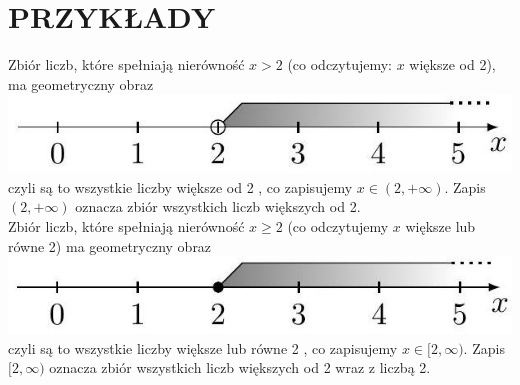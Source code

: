\documentclass[10pt]{article}
\begin{document}
\section*{PRZYKŁADY}
Zbiór liczb, które spełniają nierówność \(x>2\) (co odczytujemy: \(x\) większe od 2), ma geometryczny obraz\\
\includegraphics[max width=\textwidth, center]{2024_11_21_8f01584889ff06348ae7g-162}\\
czyli są to wszystkie liczby większe od 2 , co zapisujemy \(x \in(2,+\infty)\). Zapis \((2,+\infty)\) oznacza zbiór wszystkich liczb większych od 2.\\
Zbiór liczb, które spełniają nierówność \(x \geqslant 2\) (co odczytujemy \(x\) większe lub równe 2) ma geometryczny obraz\\
\includegraphics[max width=\textwidth, center]{2024_11_21_8f01584889ff06348ae7g-162(1)}\\
czyli są to wszystkie liczby większe lub równe 2 , co zapisujemy \(x \in[2, \infty)\). Zapis \([2, \infty)\) oznacza zbiór wszystkich liczb większych od 2 wraz z liczbą 2.
\end{document}
